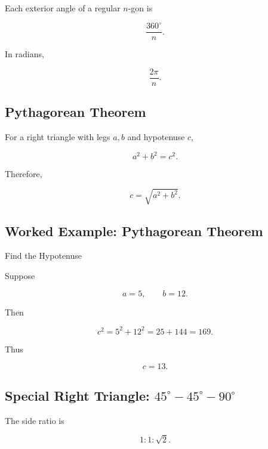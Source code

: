 Each exterior angle of a regular \(n\)-gon is

\[
\boxed{
\frac{360^\circ}{n}.
}
\]

In radians,

\[
\boxed{
\frac{2\pi}{n}.
}
\]

\subsection{Pythagorean Theorem}
\label{subsec:pythagorean-theorem-reference}

For a right triangle with legs \(a,b\) and hypotenuse \(c\),

\[
\boxed{
a^2+b^2=c^2.
}
\]

Therefore,

\[
\boxed{
c
=
\sqrt{a^2+b^2}.
}
\]

\subsection{Worked Example: Pythagorean Theorem}
\label{subsec:worked-pythagorean-reference}

\begin{workedexamplebox}{Find the Hypotenuse}

Suppose

\[
a=5,
\qquad
b=12.
\]

Then

\[
c^2
=
5^2+12^2
=
25+144
=
169.
\]

Thus

\begin{answerbox}
\[
\boxed{
c=13.
}
\]
\end{answerbox}

\end{workedexamplebox}

\subsection{Special Right Triangle: \(45^\circ-45^\circ-90^\circ\)}
\label{subsec:45-45-90-reference}

The side ratio is

\[
\boxed{
1:1:\sqrt2.
}
\]

